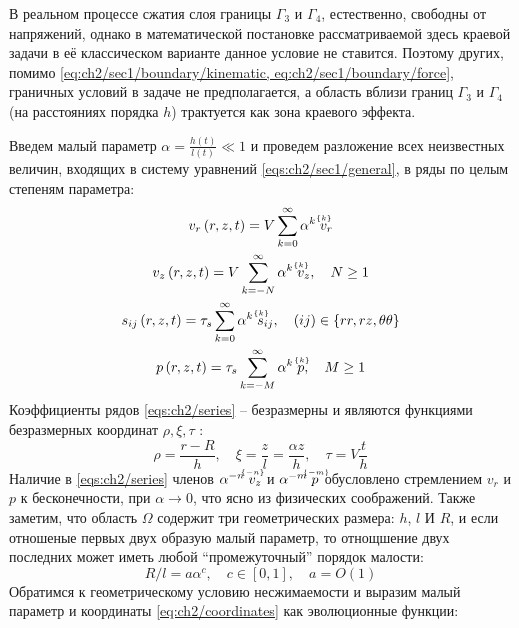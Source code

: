 В реальном процессе сжатия слоя границы $\Gamma_{3}$ и $\Gamma_{4}$, естественно, свободны от напряжений, однако в математической постановке рассматриваемой здесь краевой задачи в её классическом варианте данное условие не ставится. Поэтому других, помимо \cref{eq:ch2/sec1/boundary/kinematic, eq:ch2/sec1/boundary/force}, граничных условий в задаче не предполагается, а область вблизи границ $\Gamma_{3}$ и $\Gamma_{4}$(на расстояниях порядка $h$) трактуется как зона краевого эффекта.

Введем малый параметр $\alpha = \frac{h(t)}{l(t)} \ll 1$ и проведем разложение всех неизвестных величин, входящих в систему уравнений \cref{eqs:ch2/sec1/general}, в ряды по целым степеням параметра:
\begin{subequations}
  \label{eqs:ch2/series}
  \begin{gather}
    v_{r}\left(r, z, t\right) = V \sum_{k=0}^{\infty}{\alpha^{k} \; \uindex{v}{k}_{r}}
    \\
    v_{z}\left(r, z, t\right) = V \sum_{k=-N}^{\infty}{\alpha^{k} \; \uindex{v}{k}_{z}}, \quad N \ge 1
    \\
    s_{ij}\left(r, z, t\right) = \tau_{s} \sum_{k=0}^{\infty}{\alpha^{k} \; \uindex{s}{k}_{ij}}, \quad (ij)\in\{rr, rz, \theta\theta\}
    \\
    p\left(r, z, t \right) = \tau_{s} \sum_{k=-M}^{\infty}{\alpha^{k} \; \uindex{p}{k}}, \quad M \ge 1
  \end{gather}
\end{subequations}
Коэффициенты рядов \cref{eqs:ch2/series} -- безразмерны и являются функциями безразмерных координат $\rho, \xi, \tau$ :
\begin{equation}
  \label{eq:ch2/coordinates}
  \rho = \frac{r-R}{h}, \quad \xi = \frac{z}{l}=\frac{\alpha z}{h}, \quad \tau = V \frac{t}{h}
\end{equation}
Наличие в \cref{eqs:ch2/series} членов $\alpha^{-n} \; \uindex{v}{-n}_{z}$ и $\alpha^{-m} \; \uindex{p}{-m}$ обусловлено стремлением $v_{r}$ и $p$ к бесконечности, при $\alpha\rightarrow 0$, что ясно из физических соображений. Также заметим, что область $\Omega$ содержит три геометрических размера: $h$, $l$ И $R$, и если отношеные первых двух образую малый параметр, то отнощшение двух последних может иметь любой ``промежуточный'' порядок малости:
\begin{equation}
  \label{eq:ch2/sec1/c}
  R/l = a \alpha^c, \quad c\in[0,1], \quad a=O(1)
\end{equation}
Обратимся к геометрическому условию несжимаемости и выразим малый параметр и координаты \cref{eq:ch2/coordinates} как эволюционные функции:
